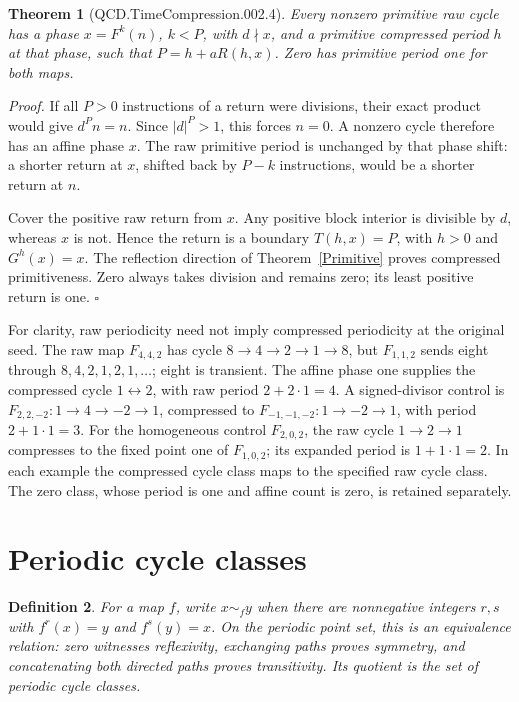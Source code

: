 \documentclass[11pt,letterpaper]{article}
\newtheorem{theorem}{Theorem}
\newtheorem{definition}[theorem]{Definition}
\newenvironment{proof}{\noindent\textit{Proof.}}{\hfill\(\square\)}
\begin{document}
\begin{theorem}[QCD.TimeCompression.002.4]\label{RawRecovery}
Every nonzero primitive raw cycle has a phase \(x=F^k(n)\), \(k<P\), with
\(d\nmid x\), and a primitive compressed period \(h\) at that phase, such that
\(P=h+aR(h,x)\). Zero has primitive period one for both maps.
\end{theorem}
\begin{proof}
If all \(P>0\) instructions of a return were divisions, their exact product
would give \(d^Pn=n\). Since \(|d|^P>1\), this forces \(n=0\).
A nonzero cycle therefore has an affine phase \(x\). The raw primitive period
is unchanged by that phase shift: a shorter return at \(x\), shifted back by
\(P-k\) instructions, would be a shorter return at \(n\).

Cover the positive raw return from \(x\). Any positive block interior is
divisible by \(d\), whereas \(x\) is not. Hence the return is a boundary
\(T(h,x)=P\), with \(h>0\) and \(G^h(x)=x\).
The reflection direction of Theorem~\ref{Primitive} proves compressed
primitiveness. Zero always takes division and remains zero; its least positive
return is one.
\end{proof}

For clarity, raw periodicity need not imply compressed periodicity at the
original seed. The raw map \(F_{4,4,2}\) has cycle
\(8\to4\to2\to1\to8\), but \(F_{1,1,2}\) sends eight through
\(8,4,2,1,2,1,\ldots\); eight is transient. The affine phase one supplies
the compressed cycle \(1\leftrightarrow2\), with raw period \(2+2\cdot1=4\).
A signed-divisor control is \(F_{2,2,-2}:1\to4\to-2\to1\), compressed to
\(F_{-1,-1,-2}:1\to-2\to1\), with period \(2+1\cdot1=3\).
For the homogeneous control \(F_{2,0,2}\), the raw cycle \(1\to2\to1\)
compresses to the fixed point one of \(F_{1,0,2}\); its expanded period is
\(1+1\cdot1=2\). In each example the compressed cycle class maps to the
specified raw cycle class. The zero class, whose period is one and affine
count is zero, is retained separately.

\section{Periodic cycle classes}

\begin{definition}
For a map \(f\), write \(x\sim_f y\) when there are nonnegative integers
\(r,s\) with \(f^r(x)=y\) and \(f^s(y)=x\). On the periodic point set,
this is an equivalence relation: zero witnesses reflexivity, exchanging paths
proves symmetry, and concatenating both directed paths proves transitivity.
Its quotient is the set of periodic cycle classes.
\end{definition}
\end{document}
